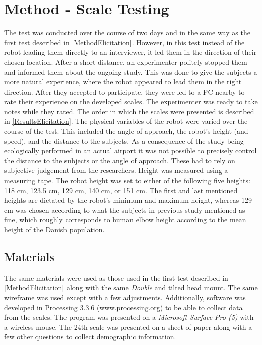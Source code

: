 \section{Method - Scale Testing}
\label{Method2}
The test was conducted over the course of two days and in the same way as the first test described in \autoref{MethodElicitation}. However, in this test instead of the robot leading them directly to an interviewer, it led them in the direction of their chosen location. After a short distance, an experimenter politely stopped them and informed them about the ongoing study. This was done to give the subjects a more natural experience, where the robot appeared to lead them in the right direction. After they accepted to participate, they were led to a PC nearby to rate their experience on the developed scales. The experimenter was ready to take notes while they rated. The order in which the scales were presented is described in \autoref{ResultsElicitation}. The physical variables of the robot were varied over the course of the test. This included the angle of approach, the robot's height (and speed), and the distance to the subjects. As a consequence of the study being ecologically performed in an actual airport it was not possible to precisely control the distance to the subjects or the angle of approach. These had to rely on subjective judgement from the researchers. Height was measured using a measuring tape. The robot height was set to either of the following five heights: 118 cm, 123.5 cm, 129 cm, 140 cm, or 151 cm. The first and last mentioned heights are dictated by the robot's minimum and maximum height, whereas 129 cm was chosen according to what the subjects in previous study mentioned as fine, which roughly corresponds to human elbow height according to the mean height of the Danish population. 

\subsection{Materials}
The same materials were used as those used in the first test described in \autoref{MethodElicitation} along with the same \textit{Double} and tilted head mount. The same wireframe was used except with a few adjustments. Additionally, software was developed in Processing 3.3.6 (\url{www.processing.org}) to be able to collect data from the scales. The program was presented on a \textit{Microsoft Surface Pro (5)} with a wireless mouse. The 24th scale was presented on a sheet of paper along with a few other questions to collect demographic information. 

